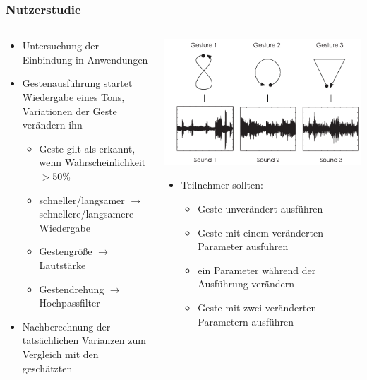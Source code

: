 \documentclass{beamer}
\begin{document}
\begin{frame}\frametitle{Nutzerstudie}
\begin{columns}
\begin{column}{.5\textwidth}
\begin{itemize}
\item Untersuchung der Einbindung in Anwendungen
\item Gestenausführung startet Wiedergabe eines Tons, Variationen der Geste verändern ihn
\begin{itemize}
\item Geste gilt als erkannt, wenn Wahrscheinlichkeit $>$50\%
\item schneller/langsamer $\rightarrow$ schnellere/langsamere Wiedergabe
\item Gestengröße $\rightarrow$ Lautstärke
\item Gestendrehung $\rightarrow$ Hochpassfilter
\end{itemize}
\item Nachberechnung der tatsächlichen Varianzen zum Vergleich mit den geschätzten
\end{itemize}
\end{column}
\begin{column}{.5\textwidth}
\includegraphics[width=\linewidth]{../Bilder/Fig10}\\
\begin{itemize}
\item Teilnehmer sollten:
\begin{itemize}
\item Geste unverändert ausführen
\item Geste mit einem veränderten Parameter ausführen
\item ein Parameter während der Ausführung verändern
\item Geste mit zwei veränderten Parametern ausführen
\end{itemize}
\end{itemize}
\end{column}
\end{columns}
\end{frame}
\end{document}

